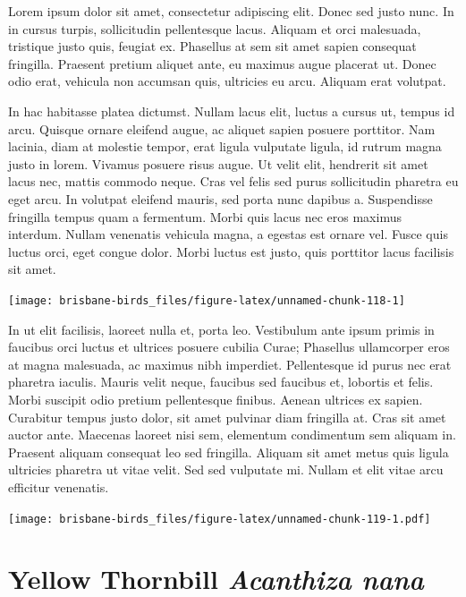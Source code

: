 \documentclass[]{book}
\let\origfigure\figure
\let\endorigfigure\endfigure
\renewenvironment{figure}[1][2] {
  \expandafter\origfigure\expandafter[H]
} {
  \endorigfigure
}
\begin{document}
Lorem ipsum dolor sit amet, consectetur adipiscing elit. Donec sed justo
nunc. In in cursus turpis, sollicitudin pellentesque lacus. Aliquam et
orci malesuada, tristique justo quis, feugiat ex. Phasellus at sem sit
amet sapien consequat fringilla. Praesent pretium aliquet ante, eu
maximus augue placerat ut. Donec odio erat, vehicula non accumsan quis,
ultricies eu arcu. Aliquam erat volutpat.

In hac habitasse platea dictumst. Nullam lacus elit, luctus a cursus ut,
tempus id arcu. Quisque ornare eleifend augue, ac aliquet sapien posuere
porttitor. Nam lacinia, diam at molestie tempor, erat ligula vulputate
ligula, id rutrum magna justo in lorem. Vivamus posuere risus augue. Ut
velit elit, hendrerit sit amet lacus nec, mattis commodo neque. Cras vel
felis sed purus sollicitudin pharetra eu eget arcu. In volutpat eleifend
mauris, sed porta nunc dapibus a. Suspendisse fringilla tempus quam a
fermentum. Morbi quis lacus nec eros maximus interdum. Nullam venenatis
vehicula magna, a egestas est ornare vel. Fusce quis luctus orci, eget
congue dolor. Morbi luctus est justo, quis porttitor lacus facilisis sit
amet.

\begin{figure}
\texttt{[image: brisbane-birds\_files/figure-latex/unnamed-chunk-118-1]} \caption{insert figure caption}\label{fig:unnamed-chunk-118}
\end{figure}

In ut elit facilisis, laoreet nulla et, porta leo. Vestibulum ante ipsum
primis in faucibus orci luctus et ultrices posuere cubilia Curae;
Phasellus ullamcorper eros at magna malesuada, ac maximus nibh
imperdiet. Pellentesque id purus nec erat pharetra iaculis. Mauris velit
neque, faucibus sed faucibus et, lobortis et felis. Morbi suscipit odio
pretium pellentesque finibus. Aenean ultrices ex sapien. Curabitur
tempus justo dolor, sit amet pulvinar diam fringilla at. Cras sit amet
auctor ante. Maecenas laoreet nisi sem, elementum condimentum sem
aliquam in. Praesent aliquam consequat leo sed fringilla. Aliquam sit
amet metus quis ligula ultricies pharetra ut vitae velit. Sed sed
vulputate mi. Nullam et elit vitae arcu efficitur venenatis.

\begin{figure}
\centering
\texttt{[image: brisbane-birds\_files/figure-latex/unnamed-chunk-119-1.pdf]}
\caption{\label{fig:unnamed-chunk-119}insert figure caption}
\end{figure}

\section{\texorpdfstring{Yellow Thornbill \emph{Acanthiza
nana}}{Yellow Thornbill Acanthiza nana}}\label{yellow-thornbill-acanthiza-nana}
\end{document}
